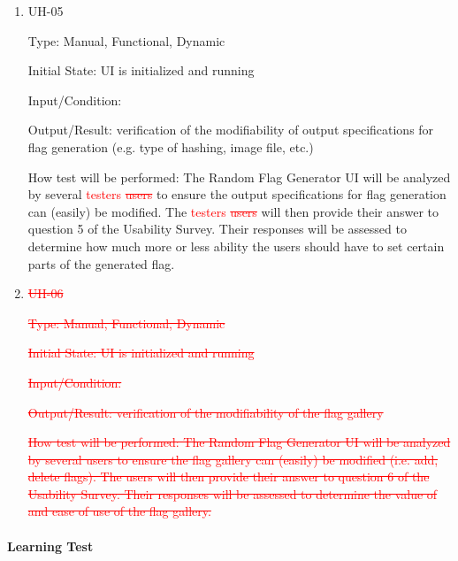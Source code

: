 \documentclass[12pt, titlepage]{article}
\begin{document}
\begin{enumerate}

\item{UH-05\\}

Type: Manual, Functional, Dynamic

Initial State: UI is initialized and running

Input/Condition: 

Output/Result: verification of the modifiability of output specifications for
flag generation (e.g. type of hashing, image file, etc.)

How test will be performed: The Random Flag Generator UI will be analyzed by
several \textcolor{red}{testers \sout{users}} to ensure the output
specifications for flag generation can (easily) be modified. The
\textcolor{red}{testers \sout{users}} will then provide their answer to
question 5 of the Usability Survey. Their responses will be assessed to
determine how much more or less ability the users should have to set certain
parts of the generated flag.

\item{\textcolor{red}{\sout{UH-06}}\\}

\textcolor{red}{\sout{Type: Manual, Functional, Dynamic}}

\textcolor{red}{\sout{Initial State: UI is initialized and running}}

\textcolor{red}{\sout{Input/Condition:}}

\textcolor{red}{\sout{Output/Result: verification of the modifiability of the
flag gallery}}

\textcolor{red}{\sout{How test will be performed: The Random Flag Generator UI
will be analyzed by several users to ensure the flag gallery can (easily) be
modified (i.e. add, delete flags). The users will then provide their answer to
question 6 of the Usability Survey. Their responses will be assessed to
determine the value of and ease of use of the flag gallery.}}

\end{enumerate}

\paragraph{Learning Test}
\end{document}
